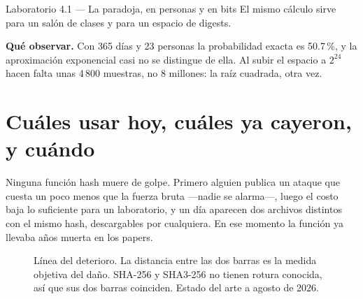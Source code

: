 \documentclass[11pt,a4paper]{article}
\theoremstyle{definition}
\theoremstyle{plain}
\theoremstyle{remark}
\begin{document}
\begin{laboratorio}{Laboratorio 4.1 — La paradoja, en personas y en bits}
El mismo cálculo sirve para un salón de clases y para un espacio de digests.

\textbf{Qué observar.} Con 365 días y 23 personas la probabilidad exacta es
50.7\,\%, y la aproximación exponencial casi no se distingue de ella. Al subir el
espacio a $2^{24}$ hacen falta unas 4\,800 muestras, no 8 millones: la raíz
cuadrada, otra vez.
\end{laboratorio}

\section{Cuáles usar hoy, cuáles ya cayeron, y cuándo}

Ninguna función hash muere de golpe. Primero alguien publica un ataque que cuesta
un poco menos que la fuerza bruta ---nadie se alarma---, luego el costo baja lo
suficiente para un laboratorio, y un día aparecen dos archivos distintos con el
mismo hash, descargables por cualquiera. En ese momento la función ya llevaba
años muerta en los papers.

\begin{figure}[htbp]
\centering
{}
\caption{Línea del deterioro. La distancia entre las dos barras es la medida
objetiva del daño. SHA-256 y SHA3-256 no tienen rotura conocida, así que sus dos
barras coinciden. Estado del arte a agosto de 2026.}
\label{fig:deterioro}
\end{figure}
\end{document}
